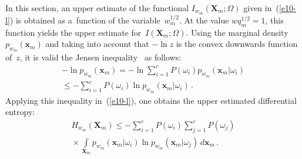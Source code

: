 \begin{multicols}{2}
\noindent
In this section, an upper estimate of the functional 
$I_{w_m}(\mathbf{X}_m;\Omega)$ given in~(\ref{e10-l}) is obtained as 
a~function of the variable~$w_m^{1/2}$.  At the value $w q_m^{1/2}=1$, this 
function yields the upper estimate for~$I(\mathbf{X}_m;\Omega)$. Using the 
marginal density $p_{w_m}(\mathbf{x}_m)$  and taking into account that $-\ln z$ 
is the convex downwards function of~$z$, it is valid the Jensen 
inequality~\cite{11-l} as follows:
\begin{multline*}
-\ln p_{w_m} \left(\mathbf{x}_m\right) = -\ln \sum\limits^c_{i=1} P(\omega_i) 
p_{w_m} \left(\mathbf{x}_m\vert   \omega_i\right)\\
{} \leq -\sum\limits^c_{i=1} 
P(\omega_i) \ln p_{w_m}\left(\mathbf{x}_m\vert \omega_i\right)\,.
\end{multline*}
Applying this inequality in~(\ref{e10-l}), one obtains the upper estimated 
differential entropy:
\begin{multline}
H_{w_m}\left(\mathbf{X}_m\right) \leq -\sum\limits^c_{i=1} P(\omega_i) 
\sum\limits^c_{j=1} P(\omega_j)\\
{}\times \int\limits_{\mathbf{X}_m} 
p_{w_m}\left(\mathbf{x}_m\vert\omega_i\right) \ln p_{w_m} 
\left(\mathbf{x}_m\vert \omega_j\right)\,d\mathbf{x}_m\,.
\label{e15-l}
\end{multline}


\end{multicols}
